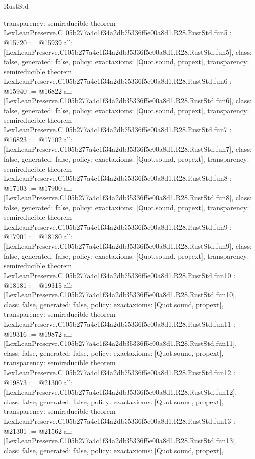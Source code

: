 \begin{lexlean}{RustStd}
\begin{coremodule}
{  transparency: semireducible
}
theorem LexLeanPreserve.C105b277a4c1f34a2db35336f5e00a8d1.R28.RustStd.fun5 : @15720 := @15939 {
  all: [LexLeanPreserve.C105b277a4c1f34a2db35336f5e00a8d1.R28.RustStd.fun5],
  class: false,
  generated: false,
  policy: exact{axioms: [Quot.sound, propext]},
  transparency: semireducible
}
theorem LexLeanPreserve.C105b277a4c1f34a2db35336f5e00a8d1.R28.RustStd.fun6 : @15940 := @16822 {
  all: [LexLeanPreserve.C105b277a4c1f34a2db35336f5e00a8d1.R28.RustStd.fun6],
  class: false,
  generated: false,
  policy: exact{axioms: [Quot.sound, propext]},
  transparency: semireducible
}
theorem LexLeanPreserve.C105b277a4c1f34a2db35336f5e00a8d1.R28.RustStd.fun7 : @16823 := @17102 {
  all: [LexLeanPreserve.C105b277a4c1f34a2db35336f5e00a8d1.R28.RustStd.fun7],
  class: false,
  generated: false,
  policy: exact{axioms: [Quot.sound, propext]},
  transparency: semireducible
}
theorem LexLeanPreserve.C105b277a4c1f34a2db35336f5e00a8d1.R28.RustStd.fun8 : @17103 := @17900 {
  all: [LexLeanPreserve.C105b277a4c1f34a2db35336f5e00a8d1.R28.RustStd.fun8],
  class: false,
  generated: false,
  policy: exact{axioms: [Quot.sound, propext]},
  transparency: semireducible
}
theorem LexLeanPreserve.C105b277a4c1f34a2db35336f5e00a8d1.R28.RustStd.fun9 : @17901 := @18180 {
  all: [LexLeanPreserve.C105b277a4c1f34a2db35336f5e00a8d1.R28.RustStd.fun9],
  class: false,
  generated: false,
  policy: exact{axioms: [Quot.sound, propext]},
  transparency: semireducible
}
theorem LexLeanPreserve.C105b277a4c1f34a2db35336f5e00a8d1.R28.RustStd.fun10 : @18181 := @19315 {
  all: [LexLeanPreserve.C105b277a4c1f34a2db35336f5e00a8d1.R28.RustStd.fun10],
  class: false,
  generated: false,
  policy: exact{axioms: [Quot.sound, propext]},
  transparency: semireducible
}
theorem LexLeanPreserve.C105b277a4c1f34a2db35336f5e00a8d1.R28.RustStd.fun11 : @19316 := @19872 {
  all: [LexLeanPreserve.C105b277a4c1f34a2db35336f5e00a8d1.R28.RustStd.fun11],
  class: false,
  generated: false,
  policy: exact{axioms: [Quot.sound, propext]},
  transparency: semireducible
}
theorem LexLeanPreserve.C105b277a4c1f34a2db35336f5e00a8d1.R28.RustStd.fun12 : @19873 := @21300 {
  all: [LexLeanPreserve.C105b277a4c1f34a2db35336f5e00a8d1.R28.RustStd.fun12],
  class: false,
  generated: false,
  policy: exact{axioms: [Quot.sound, propext]},
  transparency: semireducible
}
theorem LexLeanPreserve.C105b277a4c1f34a2db35336f5e00a8d1.R28.RustStd.fun13 : @21301 := @21562 {
  all: [LexLeanPreserve.C105b277a4c1f34a2db35336f5e00a8d1.R28.RustStd.fun13],
  class: false,
  generated: false,
  policy: exact{axioms: [Quot.sound, propext]},
}
\end{coremodule}
\end{lexlean}
